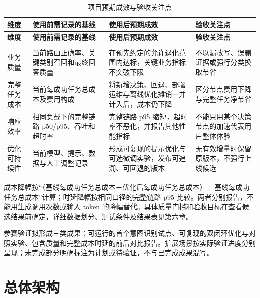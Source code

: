 \documentclass[UTF8,a4paper,11pt,fontset=windows]{ctexart}
\begin{document}
{\small\setlength{\tabcolsep}{4pt}\renewcommand{\arraystretch}{1.28}
\begin{longtable}{>{\raggedright\arraybackslash}p{0.150\dimexpr\linewidth-8\tabcolsep\relax}>{\raggedright\arraybackslash}p{0.240\dimexpr\linewidth-8\tabcolsep\relax}>{\raggedright\arraybackslash}p{0.290\dimexpr\linewidth-8\tabcolsep\relax}>{\raggedright\arraybackslash}p{0.320\dimexpr\linewidth-8\tabcolsep\relax}}
\caption{项目预期成效与验收关注点}\label{tab:expected-outcomes}\\
\toprule
\textbf{维度} & \textbf{使用前需记录的基线} & \textbf{使用后预期成效} & \textbf{验收关注点} \\
\midrule
\endfirsthead
\toprule
\textbf{维度} & \textbf{使用前需记录的基线} & \textbf{使用后预期成效} & \textbf{验收关注点} \\
\midrule
\endhead
\midrule\multicolumn{4}{r}{\scriptsize\color{Muted}续下页}\\\endfoot
\bottomrule\endlastfoot
业务质量 & 当前路由正确率、关键类别召回和最终回答质量 & 在预先约定的允许退化范围内达标，关键业务指标不突破下限 & 不以漏改写、误删证据或强行分类换取节省 \\
完整任务成本 & 当前每成功任务总成本及费用构成 & 将新增决策、回退、部署运维与离线优化摊销一并计入后，成本仍下降 & 区分节点费用下降与完整任务净节省 \\
响应效率 & 相同负载下的完整链路 p50/p95、吞吐和超时率 & 完整链路 p95 缩短，超时率不恶化，并报告其他性能指标 & 不能只用某个决策节点的加速代表用户整体体验 \\
优化可持续性 & 当前模型、提示、数据与人工调整记录 & 形成可复现的提示优化与可选微调实验，发布可追溯、可回退的版本 & 无有效增量时保留原版本，不强行上线候选 \\
\end{longtable}}

成本降幅按“（基线每成功任务总成本－优化后每成功任务总成本）÷ 基线每成功任务总成本”计算；时延降幅按相同口径的完整链路 p95 比较。两者分别报告，不能用生成调用次数或输入 token 的降幅替代。具体质量门槛和验收目标在查看候选结果前确定，详细数据划分、测试条件及结果表见第六章。


参赛验证拟形成三类成果：可运行的首个意图识别试点、可复现的双闭环优化与对照实验、包含质量和完整成本时延的前后对比报告。扩展场景按实际验证进度分别呈现；未完成部分明确标注为计划或待验证，不与已完成成果混写。


\section{总体架构}
\end{document}
